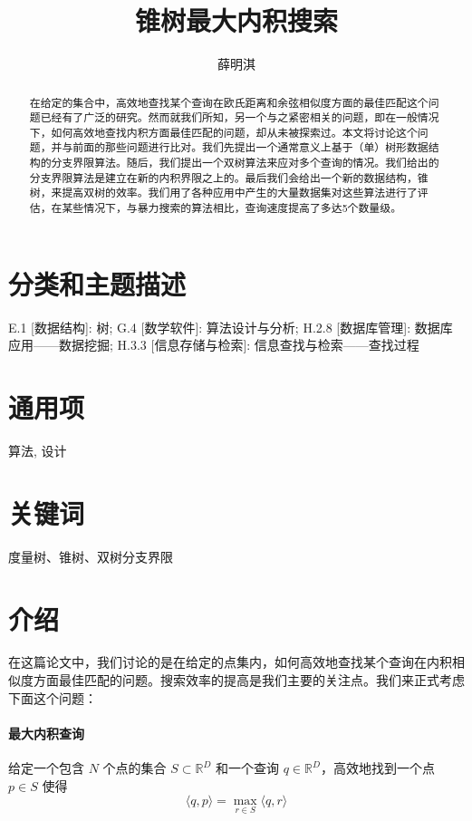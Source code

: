 \documentclass[twocolumn,a4paper]{article}
\begin{document}
\title{锥树最大内积搜索}
\author{薛明淇}
\maketitle

\begin{abstract}
在给定的集合中，高效地查找某个查询在欧氏距离和余弦相似度方面的最佳匹配这个问题已经有了广泛的研究。然而就我们所知，另一个与之紧密相关的问题，即在一般情况下，如何高效地查找内积方面最佳匹配的问题，却从未被探索过。本文将讨论这个问题，并与前面的那些问题进行比对。我们先提出一个通常意义上基于（单）树形数据结构的分支界限算法。随后，我们提出一个双树算法来应对多个查询的情况。我们给出的分支界限算法是建立在新的内积界限之上的。最后我们会给出一个新的数据结构，锥树，来提高双树的效率。我们用了各种应用中产生的大量数据集对这些算法进行了评估，在某些情况下，与暴力搜索的算法相比，查询速度提高了多达5个数量级。
\end{abstract}

\section*{分类和主题描述}
E.1 [数据结构]: 树; G.4 [数学软件]: 算法设计与分析; H.2.8 [数据库管理]: 数据库应用——数据挖掘; H.3.3 [信息存储与检索]: 信息查找与检索——查找过程
\section*{通用项}
算法, 设计
\section*{关键词}
度量树、锥树、双树分支界限

\section{介绍}
在这篇论文中，我们讨论的是在给定的点集内，如何高效地查找某个查询在内积相似度方面最佳匹配的问题。搜索效率的提高是我们主要的关注点。我们来正式考虑下面这个问题：

\paragraph{最大内积查询} 给定一个包含 $N$ 个点的集合 $S \subset \mathbb{R}^D$ 和一个查询 $q \in \mathbb{R}^D$，高效地找到一个点 $p \in S$ 使得
\begin{equation}
\langle q,p \rangle = \max_{r \in S}\langle q,r \rangle
\end{equation}
\end{document}
